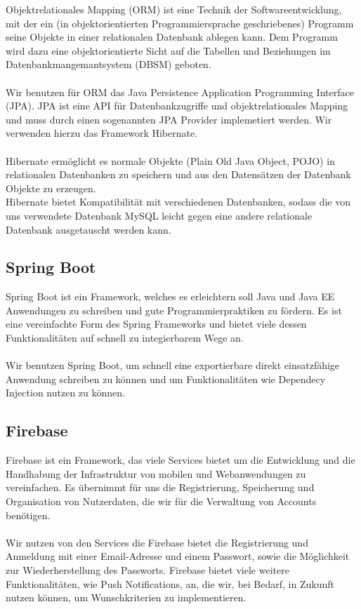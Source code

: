 \documentclass[a4paper]{scrreprt}
\begin{document}
Objektrelationales Mapping (ORM) ist eine Technik der Softwareentwicklung, mit der ein (in objektorientierten Programmiersprache geschriebenes) Programm seine Objekte in einer relationalen Datenbank ablegen kann. Dem Programm wird dazu eine objektorientierte Sicht auf die Tabellen und Beziehungen im Datenbankmangemantsystem (DBSM) geboten. \\  \\ Wir benutzen für ORM das Java Persistence Application Programming Interface (JPA). 
JPA ist eine API für Datenbankzugriffe und objektrelationales Mapping und muss durch einen sogenannten JPA Provider implemetiert werden. Wir verwenden hierzu das Framework Hibernate.\\ \\ Hibernate ermöglicht es normale Objekte (Plain Old Java Object, POJO) in relationalen Datenbanken zu speichern und aus den Datensätzen der Datenbank Objekte zu erzeugen. \\
Hibernate bietet Kompatibilität mit verschiedenen Datenbanken, sodass die von uns verwendete Datenbank MySQL leicht gegen eine andere relationale Datenbank ausgetauscht werden kann.

\subsection*{Spring Boot}

Spring Boot ist ein Framework, welches es erleichtern soll Java und Java EE Anwendungen zu schreiben und gute Programmierpraktiken zu fördern. Es ist eine vereinfachte Form des Spring Frameworks und bietet viele dessen Funktionalitäten auf schnell zu integierbarem Wege an. \\ \\
Wir benutzen Spring Boot, um schnell eine exportierbare direkt einsatzfähige Anwendung schreiben zu können und um Funktionalitäten wie Dependecy Injection nutzen zu können.

\subsection*{Firebase}
Firebase ist ein Framework, das viele Services bietet um die Entwicklung und die Handhabung der Infrastruktur von mobilen und Webanwendungen zu vereinfachen. Es übernimmt für uns die Registrierung, Speicherung und Organisation von Nutzerdaten, die wir für die Verwaltung von Accounts benötigen. \\ \\
Wir nutzen von den Services die Firebase bietet die Registrierung und Anmeldung mit einer Email-Adresse und einem Passwort, sowie die Möglichkeit zur Wiederherstellung des Passworts. Firebase bietet viele weitere Funktionalitäten, wie Push Notifications, an, die wir, bei Bedarf, in Zukunft nutzen können, um Wunschkriterien zu implementieren.
\end{document}
